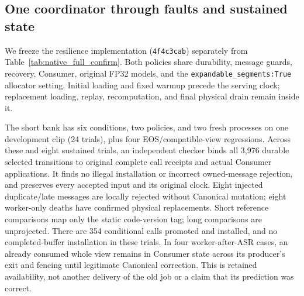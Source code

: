 \subsection{One coordinator through faults and sustained state}
\label{subsec:same_source_validation}
We freeze the resilience implementation (\texttt{4f4c3cab}) separately
from Table~\ref{tab:native_full_confirm}. Both policies share durability,
message guards, recovery, Consumer, original FP32 models, and the
\texttt{expandable\_segments:True} allocator setting. Initial loading and
fixed warmup precede the serving clock; replacement loading, replay,
recomputation, and final physical drain remain inside it.

The short bank has six conditions, two policies, and two fresh processes
on one development clip (24 trials), plus four EOS/compatible-view
regressions. Across these and eight sustained trials, an independent
checker binds all 3,976 durable selected transitions to original complete
call receipts and actual Consumer applications. It finds no illegal
installation or incorrect owned-message rejection, and preserves every
accepted input and its original clock. Eight injected duplicate/late
messages are locally rejected without Canonical mutation; eight
worker-only deaths have confirmed physical replacements. Short reference
comparisons map only the static code-version tag; long comparisons are
unprojected. There are 354 conditional calls promoted and installed,
and no completed-buffer installation in these trials.
In four worker-after-ASR cases, an already consumed whole view remains
in Consumer state across its producer's exit and fencing until legitimate
Canonical correction. This is retained availability, not another delivery
of the old job or a claim that its prediction was correct.

\begin{table}[t]
\centering
\caption{Same-source short fault study: six conditions on the fixed
development clip, two fresh trials per policy. Each cell lists
Conservative above Full-call; ranges are observed minima and maxima,
not confidence intervals. Illegal; done gives illegal installations and
completed/2 trials. Reject/mutation counts local rejections and resulting
Canonical changes. New result measures fault to actual certified
consumption of a new durable fact whose original call completes after
the fault; it excludes old-fact replay and replacement readiness.
D2/C8 counts joint whole-run passes; EOS counts D2 misses. Both-board
energy spans the original serving clock through physical drain.}
\label{tab:native_reliability}
\begingroup
\fontsize{8.5}{10}\selectfont
\setlength{\tabcolsep}{3pt}

\endgroup
\end{table}

